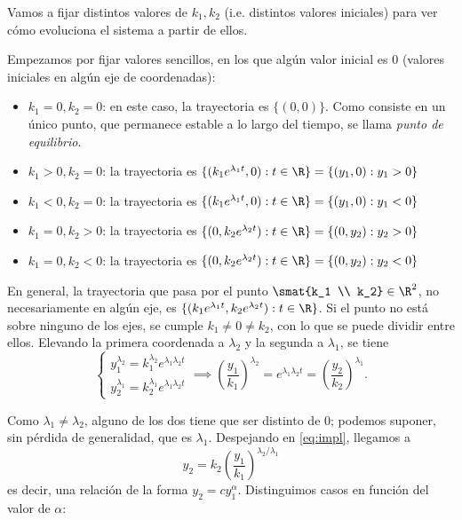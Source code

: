 \documentclass[../ecuaciones_diferenciales.tex]{subfiles}
\begin{document}
Vamos a fijar distintos valores de \(k_1,k_2\) (i.e. distintos valores
iniciales) para ver cómo evoluciona el sistema a partir de ellos.

Empezamos por fijar valores sencillos, en los que algún valor inicial es 0
(valores iniciales en algún eje de coordenadas):
\begin{itemize}
	\item \(k_1 = 0, k_2 = 0\): en este caso, la trayectoria es \(\{(0,0)\}\). Como
	      consiste en un único punto, que permanece estable a lo largo del tiempo, se
	      llama \emph{punto de equilibrio}.

	\item \(k_1 > 0, k_2 = 0\): la trayectoria es \(\{(k_1e^{\lambda_1 t}, 0) : t \in
	      \R\} = \{(y_1, 0) : y_1 > 0\}\)

	\item \(k_1 < 0, k_2 = 0\): la trayectoria es \(\{(k_1e^{\lambda_1 t}, 0) : t \in
	      \R\} = \{(y_1, 0) : y_1 < 0\}\)

	\item \(k_1 = 0, k_2 > 0\): la trayectoria es \(\{(0, k_2e^{\lambda_2 t}) : t
	      \in \R\} = \{(0,y_2) : y_2 > 0\}\)

	\item \(k_1 = 0, k_2 < 0\): la trayectoria es \(\{(0, k_2e^{\lambda_2 t}) : t
	      \in \R\} = \{(0,y_2) : y_2 < 0\}\)
\end{itemize}

En general, la trayectoria que pasa por el punto \(\smat{k_1 \\ k_2} \in \R^2\),
no necesariamente en algún eje, es
\(\{(k_1e^{\lambda_1 t}, k_2e^{\lambda_2 t}) : t \in \R\}\). Si el punto no está
sobre ninguno de los ejes, se cumple \(k_1 \neq 0 \neq k_2\), con lo que se
puede dividir entre ellos. Elevando la primera coordenada a \(\lambda_2\) y la
segunda a \(\lambda_1\), se tiene
\begin{equation}\label{eq:impl}
	\begin{cases}
		y_1^{\lambda_2} = k_1^{\lambda_2}e^{\lambda_1\lambda_2 t} \\
		y_2^{\lambda_1} = k_2^{\lambda_1}e^{\lambda_1\lambda_2 t}
	\end{cases} \implies \left(\frac{y_1}{k_1}\right)^{\lambda_2} = e^{\lambda_1
			\lambda_2 t} = \left(\frac{y_2}{k_2}\right)^{\lambda_1}.
\end{equation}

Como \(\lambda_1 \neq \lambda_2\), alguno de los dos tiene que ser distinto de
0; podemos suponer, sin pérdida de generalidad, que es \(\lambda_1\). Despejando
en \eqref{eq:impl}, llegamos a
\[y_2 = k_2 \left(\frac{y_1}{k_1}\right)^{\lambda_2 / \lambda_1}\]
es decir, una relación de la forma \(y_2 = c y_1^\alpha\). Distinguimos casos en
función del valor de \(\alpha\):
\end{document}
